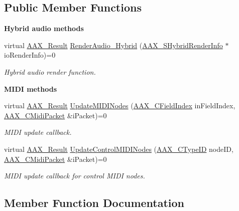 \subsection*{Public Member Functions}
\begin{Indent}{\bf Hybrid audio methods}\par
\begin{DoxyCompactItemize}
\item 
virtual \hyperlink{a00149_a4d8f69a697df7f70c3a8e9b8ee130d2f}{A\+A\+X\+\_\+\+Result} \hyperlink{a00335_gae6139041de22f51f3146d26a01c54c1b}{Render\+Audio\+\_\+\+Hybrid} (\hyperlink{a00121}{A\+A\+X\+\_\+\+S\+Hybrid\+Render\+Info} $\ast$io\+Render\+Info)=0
\begin{DoxyCompactList}\small\item\em Hybrid audio render function. \end{DoxyCompactList}\end{DoxyCompactItemize}
\end{Indent}
\begin{Indent}{\bf M\+I\+D\+I methods}\par
\begin{DoxyCompactItemize}
\item 
virtual \hyperlink{a00149_a4d8f69a697df7f70c3a8e9b8ee130d2f}{A\+A\+X\+\_\+\+Result} \hyperlink{a00062_a229029f0d4bd758538c48931b9f9a9ad}{Update\+M\+I\+D\+I\+Nodes} (\hyperlink{a00149_ae807f8986143820cfb5d6da32165c9c7}{A\+A\+X\+\_\+\+C\+Field\+Index} in\+Field\+Index, \hyperlink{a00024}{A\+A\+X\+\_\+\+C\+Midi\+Packet} \&i\+Packet)=0
\begin{DoxyCompactList}\small\item\em M\+I\+D\+I update callback. \end{DoxyCompactList}\item 
virtual \hyperlink{a00149_a4d8f69a697df7f70c3a8e9b8ee130d2f}{A\+A\+X\+\_\+\+Result} \hyperlink{a00062_ab4ec161f64086070083c21b566354861}{Update\+Control\+M\+I\+D\+I\+Nodes} (\hyperlink{a00149_ac678f9c1fbcc26315d209f71a147a175}{A\+A\+X\+\_\+\+C\+Type\+I\+D} node\+I\+D, \hyperlink{a00024}{A\+A\+X\+\_\+\+C\+Midi\+Packet} \&i\+Packet)=0
\begin{DoxyCompactList}\small\item\em M\+I\+D\+I update callback for control M\+I\+D\+I nodes. \end{DoxyCompactList}\end{DoxyCompactItemize}
\end{Indent}


\subsection{Member Function Documentation}
\hypertarget{a00062_a229029f0d4bd758538c48931b9f9a9ad}{}
